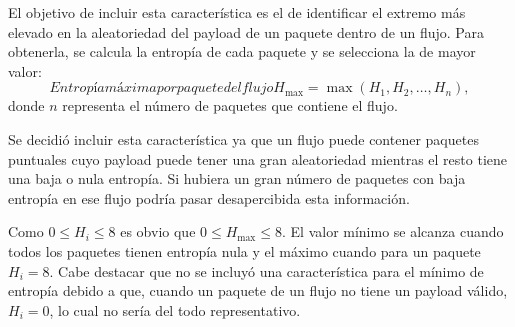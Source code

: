El objetivo de incluir esta característica es el de identificar el extremo más elevado en la aleatoriedad del payload de un paquete dentro de un flujo. Para obtenerla, se calcula la entropía de cada paquete y se selecciona la de mayor valor:
\begin{equation}[eq:maximo-entropia-paquete-flujo]{Entropía máxima por paquete del flujo}
H_{\max} = \max(H_1, H_2, \ldots, H_n),
\end{equation}donde $n$ representa el número de paquetes que contiene el flujo.

Se decidió incluir esta característica ya que un flujo puede contener paquetes puntuales cuyo payload puede tener una gran aleatoriedad mientras el resto tiene una baja o nula entropía. Si hubiera un gran número de paquetes con baja entropía en ese flujo podría pasar desapercibida esta información.

Como $0 \leq H_i \leq 8$ es obvio que $0 \leq H_{\max} \leq 8$. El valor mínimo se alcanza cuando todos los paquetes tienen entropía nula y el máximo cuando para un paquete $H_i = 8$. Cabe destacar que no se incluyó una característica para el mínimo de entropía debido a que, cuando un paquete de un flujo no tiene un payload válido, $H_i = 0$, lo cual no sería del todo representativo.
